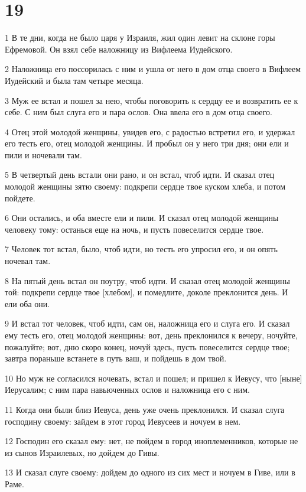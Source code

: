 \chapter{19}

\par 1 В те дни, когда не было царя у Израиля, жил один левит на склоне горы Ефремовой. Он взял себе наложницу из Вифлеема Иудейского.
\par 2 Наложница его поссорилась с ним и ушла от него в дом отца своего в Вифлеем Иудейский и была там четыре месяца.
\par 3 Муж ее встал и пошел за нею, чтобы поговорить к сердцу ее и возвратить ее к себе. С ним был слуга его и пара ослов. Она ввела его в дом отца своего.
\par 4 Отец этой молодой женщины, увидев его, с радостью встретил его, и удержал его тесть его, отец молодой женщины. И пробыл он у него три дня; они ели и пили и ночевали там.
\par 5 В четвертый день встали они рано, и он встал, чтоб идти. И сказал отец молодой женщины зятю своему: подкрепи сердце твое куском хлеба, и потом пойдете.
\par 6 Они остались, и оба вместе ели и пили. И сказал отец молодой женщины человеку тому: останься еще на ночь, и пусть повеселится сердце твое.
\par 7 Человек тот встал, было, чтоб идти, но тесть его упросил его, и он опять ночевал там.
\par 8 На пятый день встал он поутру, чтоб идти. И сказал отец молодой женщины той: подкрепи сердце твое [хлебом], и помедлите, доколе преклонится день. И ели оба они.
\par 9 И встал тот человек, чтоб идти, сам он, наложница его и слуга его. И сказал ему тесть его, отец молодой женщины: вот, день преклонился к вечеру, ночуйте, пожалуйте; вот, дню скоро конец, ночуй здесь, пусть повеселится сердце твое; завтра пораньше встанете в путь ваш, и пойдешь в дом твой.
\par 10 Но муж не согласился ночевать, встал и пошел; и пришел к Иевусу, что [ныне] Иерусалим; с ним пара навьюченных ослов и наложница его с ним.
\par 11 Когда они были близ Иевуса, день уже очень преклонился. И сказал слуга господину своему: зайдем в этот город Иевусеев и ночуем в нем.
\par 12 Господин его сказал ему: нет, не пойдем в город иноплеменников, которые не из сынов Израилевых, но дойдем до Гивы.
\par 13 И сказал слуге своему: дойдем до одного из сих мест и ночуем в Гиве, или в Раме.
